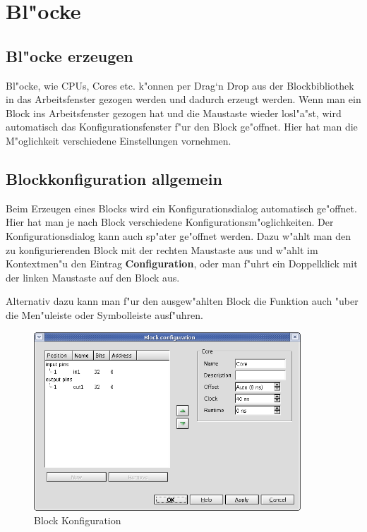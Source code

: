 \documentclass[a4paper,titlepage,12pt,ngerman]{scrbook}
\begin{document}
\section{Bl"ocke}

\subsection{Bl"ocke erzeugen}
Bl"ocke, wie CPUs, Cores etc. k"onnen per Drag`n Drop aus der Blockbibliothek in das Arbeitsfenster gezogen werden und dadurch erzeugt werden. Wenn man ein Block ins Arbeitsfenster gezogen hat und die Maustaste wieder losl"a"st, wird automatisch das Konfigurationsfenster f"ur den Block ge"offnet. Hier hat man die M"oglichkeit verschiedene Einstellungen vornehmen.

\subsection{Blockkonfiguration allgemein}
Beim Erzeugen eines Blocks wird ein Konfigurationsdialog automatisch ge"offnet. Hier hat man je nach Block verschiedene Konfigurationsm"oglichkeiten. Der Konfigurationsdialog kann auch sp"ater ge"offnet werden. Dazu w"ahlt man den zu konfigurierenden Block mit der rechten Maustaste aus und w"ahlt im Kontextmen"u den Eintrag {\bf Configuration}, oder man f"uhrt ein Doppelklick mit der linken Maustaste auf den Block aus.\par
Alternativ dazu kann man f"ur den ausgew"ahlten Block die Funktion auch "uber die Men"uleiste oder Symbolleiste ausf"uhren. \par

\begin{figure}[htbp]

\begin{center}

\includegraphics[width=10cm]{CoreBlockConfiguration}

\caption{Block Konfiguration}\label{test}

\end{center}

\end{figure}
\end{document}
